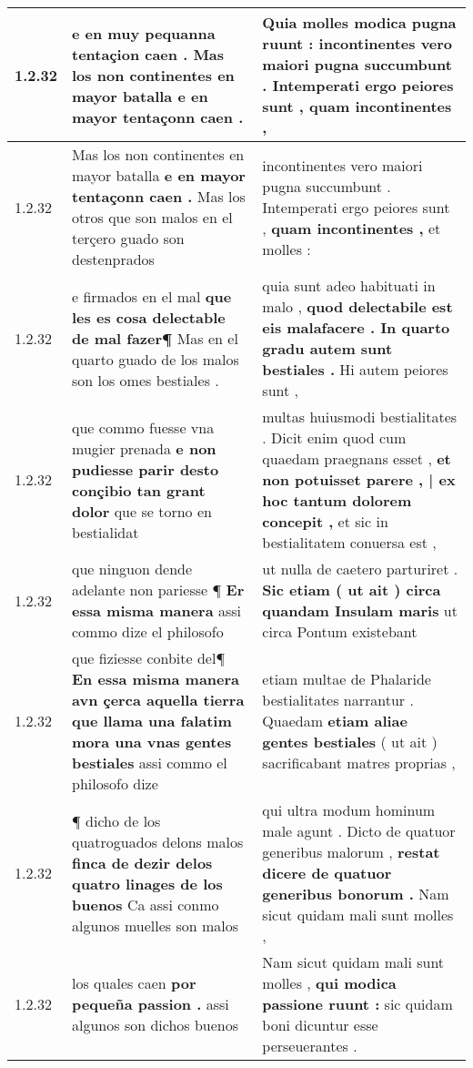 \begin{tabular}{|p{1cm}|p{6.5cm}|p{6.5cm}|}
1.2.32 & e en muy pequanna tentaçion caen . \textbf{ Mas los non continentes en mayor batalla } e en mayor tentaçonn caen . & Quia molles modica pugna ruunt : \textbf{ incontinentes vero maiori pugna succumbunt . Intemperati ergo peiores sunt , } quam incontinentes , \\\hline
1.2.32 & Mas los non continentes en mayor batalla \textbf{ e en mayor tentaçonn caen . } Mas los otros que son malos en el terçero guado son destenprados & incontinentes vero maiori pugna succumbunt . Intemperati ergo peiores sunt , \textbf{ quam incontinentes , } et molles : \\\hline
1.2.32 & e firmados en el mal \textbf{ que les es cosa delectable de mal fazer¶ } Mas en el quarto guado de los malos son los omes bestiales . & quia sunt adeo habituati in malo , \textbf{ quod delectabile est eis malafacere . In quarto gradu autem sunt bestiales . } Hi autem peiores sunt , \\\hline
1.2.32 & que commo fuesse vna mugier prenada \textbf{ e non pudiesse parir desto conçibio tan grant dolor } que se torno en bestialidat & multas huiusmodi bestialitates . Dicit enim quod cum quaedam praegnans esset , \textbf{ et non potuisset parere , | ex hoc tantum dolorem concepit , } et sic in bestialitatem conuersa est , \\\hline
1.2.32 & que ninguon dende adelante non pariesse ¶ \textbf{ Er essa misma manera } assi commo dize el philosofo & ut nulla de caetero parturiret . \textbf{ Sic etiam ( ut ait ) circa quandam Insulam maris } ut circa Pontum existebant \\\hline
1.2.32 & que fiziesse conbite del¶ \textbf{ En essa misma manera avn çerca aquella tierra que llama una falatim mora una vnas gentes bestiales } assi commo el philosofo dize & etiam multae de Phalaride bestialitates narrantur . Quaedam \textbf{ etiam aliae gentes bestiales } ( ut ait ) sacrificabant matres proprias , \\\hline
1.2.32 & ¶ dicho de los quatroguados delons malos \textbf{ finca de dezir delos quatro linages de los buenos } Ca assi conmo algunos muelles son malos & qui ultra modum hominum male agunt . Dicto de quatuor generibus malorum , \textbf{ restat dicere de quatuor generibus bonorum . } Nam sicut quidam mali sunt molles , \\\hline
1.2.32 & los quales caen \textbf{ por pequeña passion . } assi algunos son dichos buenos & Nam sicut quidam mali sunt molles , \textbf{ qui modica passione ruunt : } sic quidam boni dicuntur esse perseuerantes . \\\hline

\end{tabular}
